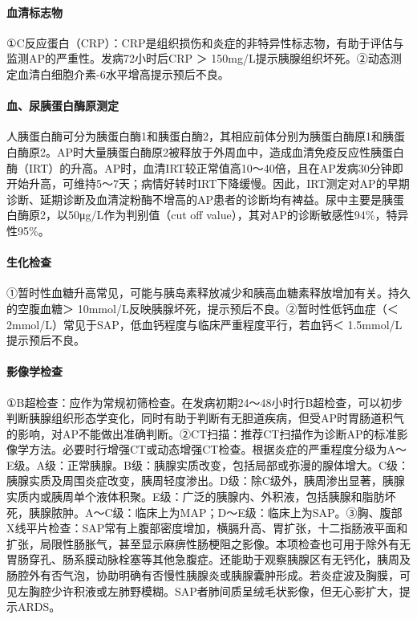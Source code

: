 \paragraph{血清标志物}

①C反应蛋白（CRP）：CRP是组织损伤和炎症的非特异性标志物，有助于评估与监测AP的严重性。发病72小时后CRP
＞
150mg/L提示胰腺组织坏死。②动态测定血清白细胞介素-6水平增高提示预后不良。

\paragraph{血、尿胰蛋白酶原测定}

人胰蛋白酶可分为胰蛋白酶1和胰蛋白酶2，其相应前体分别为胰蛋白酶原1和胰蛋白酶原2。AP时大量胰蛋白酶原2被释放于外周血中，造成血清免疫反应性胰蛋白酶（IRT）的升高。AP时，血清IRT较正常值高10～40倍，且在AP发病30分钟即开始升高，可维持5～7天；病情好转时IRT下降缓慢。因此，IRT测定对AP的早期诊断、延期诊断及血清淀粉酶不增高的AP患者的诊断均有裨益。尿中主要是胰蛋白酶原2，以50μg/L作为判别值（cut
off value），其对AP的诊断敏感性94\%，特异性95\%。

\paragraph{生化检查}

①暂时性血糖升高常见，可能与胰岛素释放减少和胰高血糖素释放增加有关。持久的空腹血糖＞
10mmol/L反映胰腺坏死，提示预后不良。②暂时性低钙血症（＜
2mmol/L）常见于SAP，低血钙程度与临床严重程度平行，若血钙＜
1.5mmol/L提示预后不良。

\paragraph{影像学检查}

①B超检查：应作为常规初筛检查。在发病初期24～48小时行B超检查，可以初步判断胰腺组织形态学变化，同时有助于判断有无胆道疾病，但受AP时胃肠道积气的影响，对AP不能做出准确判断。②CT扫描：推荐CT扫描作为诊断AP的标准影像学方法。必要时行增强CT或动态增强CT检查。根据炎症的严重程度分级为A～E级。A级：正常胰腺。B级：胰腺实质改变，包括局部或弥漫的腺体增大。C级：胰腺实质及周围炎症改变，胰周轻度渗出。D级：除C级外，胰周渗出显著，胰腺实质内或胰周单个液体积聚。E级：广泛的胰腺内、外积液，包括胰腺和脂肪坏死，胰腺脓肿。A～C级：临床上为MAP；D～E级：临床上为SAP。③胸、腹部X线平片检查：SAP常有上腹部密度增加，横膈升高、胃扩张，十二指肠液平面和扩张，局限性肠胀气，甚至显示麻痹性肠梗阻之影像。本项检查也可用于除外有无胃肠穿孔、肠系膜动脉栓塞等其他急腹症。还能助于观察胰腺区有无钙化，胰周及肠腔外有否气泡，协助明确有否慢性胰腺炎或胰腺囊肿形成。若炎症波及胸膜，可见左胸腔少许积液或左肺野模糊。SAP者肺间质呈绒毛状影像，但无心影扩大，提示ARDS。

